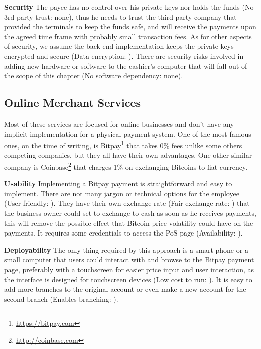 \textbf{Security}
The payee has no control over his private keys nor holds the funds (No 3rd-party trust: none), thus he needs to trust the third-party company that provided the terminals to keep the funds safe, and will receive the payments upon the agreed time frame with probably small transaction fees. As for other aspects of security, we assume the back-end implementation keeps the private keys encrypted and secure (Data encryption: \full). There are security risks involved in adding new hardware or software to the cashier's computer that will fall out of the scope of this chapter (No software dependency: none).

\subsection{Online Merchant Services}
Most of these services are focused for online businesses and don't have any implicit implementation for a physical payment system. 
One of the most famous ones, on the time of writing, is Bitpay\footnote{\url{https://bitpay.com}} that takes 0\% fees unlike some others competing companies, but they all have their own advantages. One other similar company is Coinbase\footnote{\url{http://coinbase.com}} that charges 1\% on exchanging Bitcoins to fiat currency.

 \textbf{Usability}
Implementing a Bitpay payment is straightforward and easy to implement. There are not many jargon or technical options for the employee (User friendly: \full). They have their own exchange rate (Fair exchange rate: \prt) that the business owner could set to exchange to cash as soon as he receives payments, this will remove the possible effect that Bitcoin price volatility could have on the payments. It requires some credentials to access the PoS page (Availability: \prt).

 \textbf{Deployability}
The only thing required by this approach is a smart phone or a small computer that users could interact with and browse to the Bitpay payment page, preferably with a touchscreen for easier price input and user interaction, as the interface is designed for touchscreen devices (Low cost to run: \full). It is easy to add more branches to the original account or even make a new account for the second branch (Enables branching: \full).

